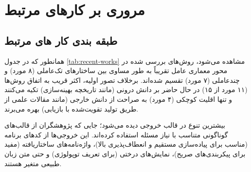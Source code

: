 \chapter{مروری بر کارهای مرتبط}
\thispagestyle{empty}





\section{طبقه بندی کار های مرتبط}
 همانطور که در جدول \ref{tab:recent-works} مشاهده می‌شود، روش‌های بررسی شده در محور معماری عامل تقریباً به طور مساوی بین ساختارهای تک‌عاملی (۸ مورد) و چندعاملی (۷ مورد) تقسیم شده‌اند. برخلاف تصور اولیه، اکثر قریب به اتفاق روش‌ها (۱۱ مورد از ۱۵) در حال حاضر بر دانش درونی (مانند تاریخچه بهینه‌سازی) تکیه می‌کنند و تنها اقلیت کوچکی (۴ مورد) به صراحت از دانش خارجی (مانند مقالات علمی از طریق تولید تقویت‌شده با بازیابی) بهره می‌برند.

بیشترین تنوع در قالب خروجی دیده می‌شود؛ جایی که پژوهشگران از قالب‌های گوناگونی متناسب با نیاز مسئله استفاده کرده‌اند. این خروجی‌ها از کدهای برنامه (مناسب برای پیاده‌سازی مستقیم و انعطاف‌پذیری بالا)، واژه‌نامه‌های ساختاریافته (مفید برای پیکربندی‌های صریح)، نمایش‌های درختی (برای تعریف توپولوژی) و حتی متن زبان طبیعی متغیر هستند.


